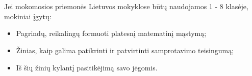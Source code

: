 \documentclass{article}
\begin{document}
\begin{figure}
    \\
    \\
    \subfigure[Counters]{\phantom{xxxxxxxxxxxxxx}}
\end{figure}


Jei mokomosios priemonės Lietuvos mokyklose būtų naudojamos 1 - 8 klasėje, mokiniai įgytų:

\begin{itemize}
\item Pagrindų, reikalingų formuoti platesnį matematinį mąstymą;
\item Žinias, kaip galima patikrinti ir patvirtinti samprotavimo teisingumą;
\item Iš šių žinių kylantį pasitikėjimą savo jėgomis.
\end{itemize}
\end{document}
